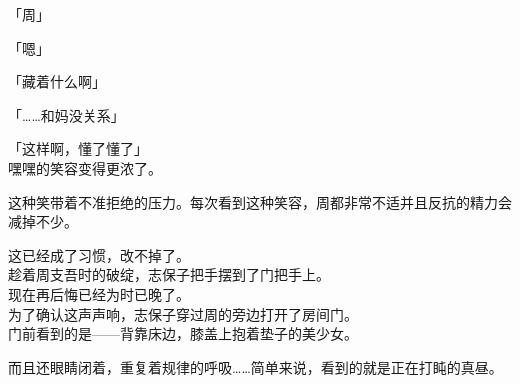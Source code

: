 「周」

「嗯」

「藏着什么啊」

「……和妈没关系」

「这样啊，懂了懂了」\\

嘿嘿的笑容变得更浓了。

这种笑带着不准拒绝的压力。每次看到这种笑容，周都非常不适并且反抗的精力会减掉不少。

这已经成了习惯，改不掉了。\\

趁着周支吾时的破绽，志保子把手摆到了门把手上。\\

现在再后悔已经为时已晚了。\\

为了确认这声声响，志保子穿过周的旁边打开了房间门。\\

门前看到的是——背靠床边，膝盖上抱着垫子的美少女。

而且还眼睛闭着，重复着规律的呼吸……简单来说，看到的就是正在打盹的真昼。\\

